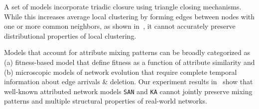 

A set of models
\cite{holme2002growing,klemm2002highly,leskovec2008microscopic}
incorporate triadic closure using triangle closing mechanisms.
While this increases {average} local clustering by forming edges between nodes
with one or more common neighbors, as shown in~, it cannot
accurately preserve distributional properties of local clustering.

Models \cite{de2013scale,karimi2017visibility,gong2012evolution,zheleva2009co}
that account for attribute mixing patterns can be broadly categorized as (a) fitness-based model that define fitness as a function of
attribute similarity and (b) microscopic models of network evolution that require
complete temporal information about edge arrivals \& deletion. Our experiment
results in~ show that well-known attributed network models
\texttt{SAN} and \texttt{KA} cannot jointly preserve mixing patterns and multiple structural
properties of real-world networks.


